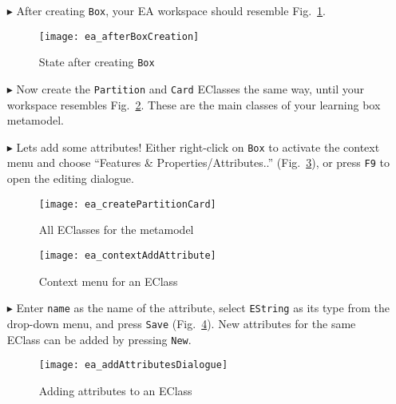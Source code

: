 \begin{itemize}
\item[$\blacktriangleright$] After creating \texttt{Box}, your EA workspace should resemble Fig.~\ref{ea:eclass_completed}.

\vspace{0.5cm}

\begin{figure}[htbp]
	\centering
  \texttt{[image: ea\_afterBoxCreation]}
	\caption{State after creating \texttt{Box}}
	\label{ea:eclass_completed}
\end{figure}

\item[$\blacktriangleright$] Now create the \texttt{Partition} and \texttt{Card} EClasses the same way, until your workspace resembles
Fig.~\ref{ea:all_eclasses}. These are the main classes of your learning box metamodel.

\vspace{0.5cm}

\item[$\blacktriangleright$] Lets add some attributes! Either right-click on \texttt{Box} to activate the context menu and choose ``Features \&
Properties/Attributes..'' (Fig.~\ref{ea:attribute}), or press \texttt{F9} to open the editing dialogue.

\begin{figure}[htbp]
	\centering
  \texttt{[image: ea\_createPartitionCard]}
	\caption{All EClasses for the metamodel}
	\label{ea:all_eclasses}
\end{figure}

\begin{figure}[htbp]
	\centering
  \texttt{[image: ea\_contextAddAttribute]}
	\caption{Context menu for an EClass}
	\label{ea:attribute}
\end{figure}
\FloatBarrier

\item[$\blacktriangleright$] Enter \texttt{name} as the name of the attribute, select \texttt{EString} as its type from the drop-down menu, and press
\texttt{Save} (Fig.~\ref{ea:attribute_properties}). New attributes for the same EClass can be added by pressing \texttt{New}.

\vspace{1.0cm}

\begin{figure}[htbp]
	\centering
  \texttt{[image: ea\_addAttributesDialogue]}
	\caption{Adding attributes to an EClass}
	\label{ea:attribute_properties}
\end{figure}


\end{itemize}
